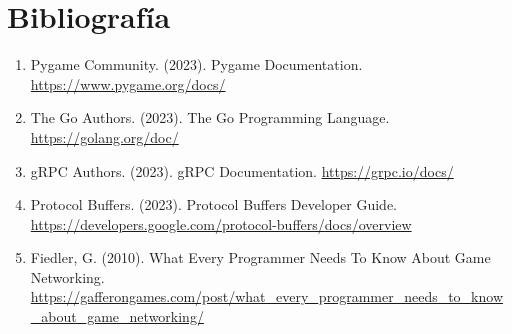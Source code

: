 \documentclass[11pt,letterpaper]{article}
\begin{document}
\section{Bibliografía}

\begin{enumerate}
    \item Pygame Community. (2023). Pygame Documentation. \url{https://www.pygame.org/docs/}
    \item The Go Authors. (2023). The Go Programming Language. \url{https://golang.org/doc/}
    \item gRPC Authors. (2023). gRPC Documentation. \url{https://grpc.io/docs/}
    \item Protocol Buffers. (2023). Protocol Buffers Developer Guide. \url{https://developers.google.com/protocol-buffers/docs/overview}
    \item Fiedler, G. (2010). What Every Programmer Needs To Know About Game Networking. \url{https://gafferongames.com/post/what_every_programmer_needs_to_know_about_game_networking/}
\end{enumerate}
\end{document}
